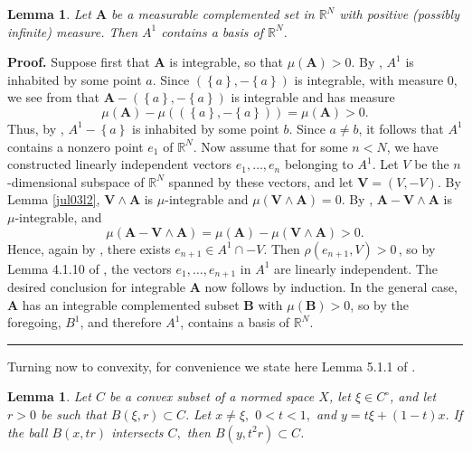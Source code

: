 \documentclass[11pt]{article}%
\newtheorem{lemma}[theorem]{Lemma}
\newenvironment{proof}[1][Proof]{\noindent\textbf{#1.} }{\ \rule{0.5em}{0.5em}}
\begin{document}
\begin{lemma}
\label{jul02l1}Let $\mathbf{A}$ be a measurable complemented set in
$\mathbb{R}^{N}$ with positive (possibly infinite) measure. Then $A^{1}$
contains a basis of $\mathbb{R}^{N}$.
\end{lemma}

\begin{proof}
Suppose first that $\mathbf{A}$ is integrable, so that $\mu(\mathbf{A})>0$. By
\cite[Ch. 6, (3.4)]{BB}, $A^{1}$ is inhabited by some point $a$. Since
$\left(  \left\{  a\right\}  ,-\left\{  a\right\}  \right)  $ is integrable,
with measure $0$, we see from \cite[Ch. 6, (3.6)]{BB} that $\mathbf{A}-\left(
\left\{  a\right\}  ,-\left\{  a\right\}  \right)  $ is integrable and has
measure%
\[
\mu(\mathbf{A})-\mu\left(  \left(  \left\{  a\right\}  ,-\left\{  a\right\}
\right)  \right)  =\mu(\mathbf{A})>0\text{.}%
\]
Thus, by \cite[Ch. 6, (3.4)]{BB}, $A^{1}-\left\{  a\right\}  $ is inhabited by
some point $b$. Since $a\neq b$, it follows that $A^{1}$ contains a nonzero
point $e_{1}$ of $\mathbb{R}^{N}$. Now assume that for some $n<N$, we have
constructed linearly independent vectors $e_{1},\ldots,e_{n}$ belonging to
$A^{1}$. Let $V$ be the $n$-dimensional subspace of $\mathbb{R}^{N}$ spanned
by these vectors, and let $\mathbf{V}=\left(  V,-V\right)  $. By Lemma
\ref{jul03l2}, $\mathbf{V}\wedge\mathbf{A}$ is $\mu$-integrable and
$\mu(\mathbf{V}\wedge\mathbf{A})=0$. By \cite[Ch. 6, (3.6)]{BB},
$\mathbf{A}-\mathbf{V}\wedge\mathbf{A}$ is $\mu$-integrable, and%
\[
\mu(\mathbf{A}-\mathbf{V}\wedge\mathbf{A})=\mu(\mathbf{A})-\mu(\mathbf{V}%
\wedge\mathbf{A})>0.
\]
Hence, again by \cite[Ch. 6, (3.6)]{BB}, there exists $e_{n+1}\in A^{1}\cap
-V$. Then $\rho(e_{n+1},V)>0\,$, so by Lemma 4.1.10 of \cite{BVtech}, the
vectors $e_{1},\ldots,e_{n+1}$ in $A^{1}$ are linearly independent. The
desired conclusion for integrable $\mathbf{A}$ now follows by induction. In
the general case, $\mathbf{A}$ has an integrable complemented subset
$\mathbf{B}$ with $\mu(\mathbf{B})>0$, so by the foregoing, $B^{1}$, and
therefore $A^{1}$, contains a basis of $\mathbb{R}^{N}$.
\end{proof}

%

\medskip


Turning now to convexity, for convenience we state here Lemma 5.1.1 of
\cite{BVtech}.

\begin{lemma}
\label{jul14l1}Let $C$ be a convex subset of a normed space $X$, let $\xi\in
C^{\circ}$, and let $r>0$ be such that $B(\xi,r)\subset C.$ Let $x\neq\xi,$
$0<t<1,$ and $y=t\xi+\left(  1-t\right)  x.$ If the ball $B(x,tr)$ intersects
$C,$ then $B(y,t^{2}r)\subset C$.
\end{lemma}
\end{document}
